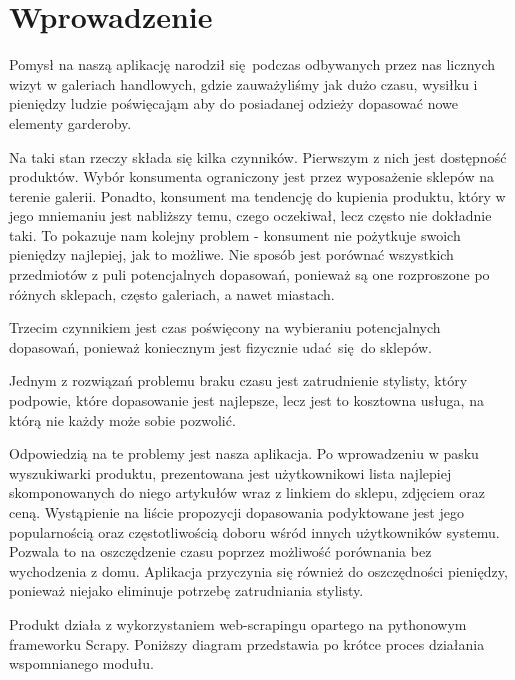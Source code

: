 \chapter{Wprowadzenie}

Pomysł na naszą aplikację narodził się podczas odbywanych przez nas licznych wizyt w galeriach handlowych, gdzie zauważyliśmy jak dużo czasu, wysiłku i pieniędzy ludzie poświęcająm aby do posiadanej odzieży dopasować nowe elementy garderoby.

Na taki stan rzeczy składa się kilka czynników. Pierwszym z nich jest dostępność produktów. Wybór konsumenta ograniczony jest przez wyposażenie sklepów na terenie galerii. Ponadto, konsument ma tendencję do kupienia produktu, który w jego mniemaniu jest nabliższy temu, czego oczekiwał, lecz często nie dokładnie taki. To pokazuje nam kolejny problem - konsument nie pożytkuje swoich pieniędzy najlepiej, jak to możliwe. Nie sposób jest porównać wszystkich przedmiotów z puli potencjalnych dopasowań, ponieważ są one rozproszone po różnych sklepach, często galeriach, a nawet miastach. 

Trzecim czynnikiem jest czas poświęcony na wybieraniu potencjalnych dopasowań, ponieważ koniecznym jest fizycznie udać się do sklepów.

Jednym z rozwiązań problemu braku czasu jest zatrudnienie stylisty, który podpowie, które dopasowanie jest najlepsze, lecz jest to kosztowna usługa, na którą nie każdy może sobie pozwolić.

Odpowiedzią na te problemy jest nasza aplikacja. Po wprowadzeniu w pasku wyszukiwarki produktu, prezentowana jest użytkownikowi lista najlepiej skomponowanych do niego artykułów wraz z linkiem do sklepu, zdjęciem oraz ceną.
Wystąpienie na liście propozycji dopasowania podyktowane jest jego popularnością oraz częstotliwością doboru wśród innych użytkowników systemu.
Pozwala to na oszczędzenie czasu poprzez możliwość porównania bez wychodzenia z domu.
Aplikacja przyczynia się również do oszczędności pieniędzy, ponieważ niejako eliminuje potrzebę zatrudniania stylisty.

Produkt działa z wykorzystaniem web-scrapingu opartego na pythonowym frameworku Scrapy.
Poniższy diagram przedstawia po krótce proces działania wspomnianego modułu.

